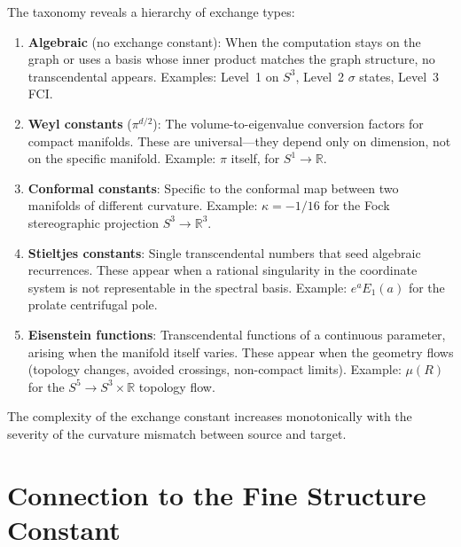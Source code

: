 \documentclass[aps,pra,twocolumn,superscriptaddress,longbibliography]{revtex4-2}
\begin{document}
The taxonomy reveals a hierarchy of exchange types:
\begin{enumerate}
  \item \textbf{Algebraic} (no exchange constant): When the
    computation stays on the graph or uses a basis whose inner
    product matches the graph structure, no transcendental
    appears.  Examples: Level~1 on $S^3$, Level~2 $\sigma$
    states, Level~3 FCI.

  \item \textbf{Weyl constants} ($\pi^{d/2}$): The
    volume-to-eigenvalue conversion factors for compact
    manifolds.  These are universal---they depend only on
    dimension, not on the specific manifold.  Example: $\pi$
    itself, for $S^1 \to \mathbb{R}$.

  \item \textbf{Conformal constants}: Specific to the conformal
    map between two manifolds of different curvature.  Example:
    $\kappa = -1/16$ for the Fock stereographic projection
    $S^3 \to \mathbb{R}^3$.

  \item \textbf{Stieltjes constants}: Single transcendental
    numbers that seed algebraic recurrences.  These appear when
    a rational singularity in the coordinate system is not
    representable in the spectral basis.  Example:
    $e^a E_1(a)$ for the prolate centrifugal pole.

  \item \textbf{Eisenstein functions}: Transcendental functions
    of a continuous parameter, arising when the manifold itself
    varies.  These appear when the geometry flows (topology
    changes, avoided crossings, non-compact limits).  Example:
    $\mu(R)$ for the $S^5 \to S^3 \times \mathbb{R}$ topology
    flow.
\end{enumerate}

The complexity of the exchange constant increases monotonically
with the severity of the curvature mismatch between source and
target.



\section{Connection to the Fine Structure Constant}
\label{sec:alpha}
\end{document}
